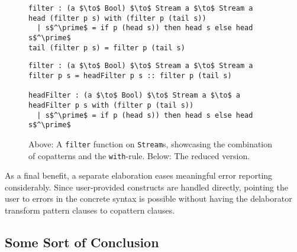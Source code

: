\begin{figure}[h]
\begin{lstlisting}[mathescape]
filter : (a $\to$ Bool) $\to$ Stream a $\to$ Stream a
head (filter p s) with (filter p (tail s))
  | s$^\prime$ = if p (head s)) then head s else head s$^\prime$
tail (filter p s) = filter p (tail s)
\end{lstlisting}

\begin{lstlisting}[mathescape]
filter : (a $\to$ Bool) $\to$ Stream a $\to$ Stream a
filter p s = headFilter p s :: filter p (tail s)

headFilter : (a $\to$ Bool) $\to$ Stream a $\to$ a
headFilter p s with (filter p (tail s))
  | s$^\prime$ = if p (head s)) then head s else head s$^\prime$
\end{lstlisting}
  \caption{Above: A \texttt{filter} function on \texttt{Stream}s, showcasing the
    combination of copatterns and the \texttt{with}-rule. Below: The reduced
    version.}
\label{fig:copatterns_with_rule}
\end{figure}

As a final benefit, a separate elaboration eases meaningful error reporting
considerably. Since user-provided constructs are handled directly, pointing the
user to errors in the concrete syntax is possible without having the delaborator
transform pattern clauses to copattern clauses.

\subsection{Some Sort of Conclusion}

